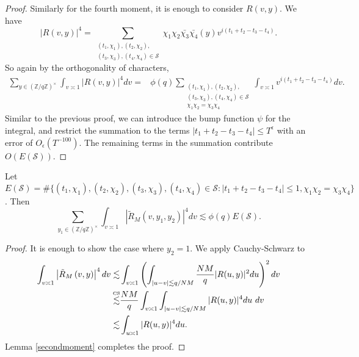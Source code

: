 \begin{proof}
    Similarly for the fourth moment, it is enough to consider $R(v,y)$. We have \[
    |R(v,y)|^4 = \sum_{\substack{(t_1,\chi_1),(t_2,\chi_2),\\ (t_3,\chi_3),(t_4,\chi_4)\in \mathcal{S}}}
    \chi_1{\chi}_2\bar{\chi_3}\bar{\chi_4}(y)v^{i(t_1+t_2-t_3-t_4)}.
    \]
    So again by the orthogonality of characters, \begin{align*}
        \sum_{y\in (\mathbb{Z}/q\mathbb{Z})^\times} \int_{v\asymp 1} 
        \left|R\left(v,y\right)\right|^4dv = & \phi(q)
        \sum_{\substack{(t_1,\chi_1),(t_2,\chi_2),\\ (t_3,\chi_3),(t_4,\chi_4)\in \mathcal{S}\\ \chi_1\chi_2=\chi_3\chi_4}} \int_{v\asymp 1} v^{i(t_1+t_2-t_3-t_4)} dv.
    \end{align*}
    Similar to the previous proof, we can introduce the bump function $\psi$ for the integral, and restrict the summation to the terms $|t_1+t_2-t_3-t_4|\leq T^\epsilon$ with an error of $O_\epsilon(T^{-100})$. The remaining terms in the summation contribute $O(E(\mathcal{S}))$.
\end{proof}
\begin{lemma}\label{fourthmoment_smooth}
    Let $E(\mathcal{S})=\#\{(t_1,\chi_1),(t_2,\chi_2),(t_3,\chi_3),(t_4,\chi_4)\in \mathcal{S}  :  |t_1+t_2-t_3-t_4|\leq 1, \chi_1\chi_2=\chi_3\chi_4\}$. Then \[
        \sum_{y_1\in (\mathbb{Z}/q\mathbb{Z})^\times} \int_{v\asymp 1} 
        \left|\tilde{R}_M\left(v,y_1,y_2\right)\right|^4dv  \lesssim \phi(q)E(\mathcal{S}).
    \]
\end{lemma}
\begin{proof}
    It is enough to show the case where $y_2=1$.
    We apply Cauchy-Schwarz to \begin{align*}
        \int_{v\asymp 1} 
        \left|\tilde{R}_M\left(v,y\right)\right|^4dv  \lesssim& \int_{v\asymp 1} 
        \left(\int_{|u-v|\lesssim q/NM}
        \frac{NM}{q}|R(u,y)|^2 du\right)^2
        dv \\
        \stackon{CS}{\lesssim}& \frac{NM}{q} \int_{v\asymp 1} 
       \int_{|u-v|\lesssim q/NM}
        |R(u,y)|^4 du \ 
        dv\\
        \lesssim&  
        \int_{u\asymp 1}
         |R(u,y)|^4 du.
    \end{align*}
    Lemma \ref{secondmoment} completes the proof.
\end{proof}

